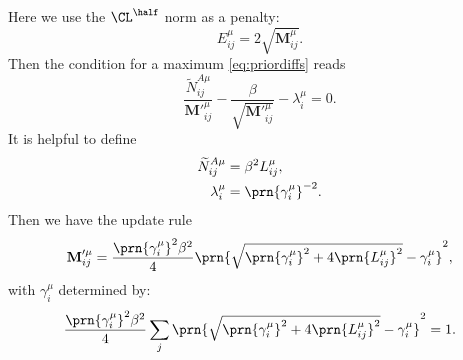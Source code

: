 \documentclass[12pt]{article}
\newcommand{\M}{\mathbf{M}}
\begin{document}
Here we use the  $\CL^\half$ norm as a penalty:
%
\begin{equation}\label{eq:Lhalfpenalty}
  E^\mu_{ij} = 2\sqrt{\M^\mu_{ij}}.
\end{equation}
%
Then the condition for a maximum \eqref{eq:priordiffs} reads
%
\begin{equation}\label{eq:Lhalfpriormax}
  \frac{ \widetilde{N}^{A\mu}_{ij} }{ \M'^\mu_{ij} }  - \frac{\beta}{\sqrt{\M'^\mu_{ij}}} - \lambda^\mu_{i} = 0.
\end{equation}
%
It is helpful to define
%
\begin{equation}\label{eq:Lhalfvars}
\begin{aligned}
  \widetilde{N}^{A\mu}_{ij} &= \beta^2 L^\mu_{ij}, \\
  \lambda^\mu_i &= \prn{\gamma^\mu_i}^{-2}.
\end{aligned}
\end{equation}
%
Then we have the update rule
%
\begin{equation}\label{eq:Lhalfupdate}
  \M'^\mu_{ij} = \frac{ \prn{\gamma^\mu_i}^2 \beta^2 }{ 4 } \prn{\sqrt{ \prn{\gamma^\mu_i}^2 + 4\prn{L^\mu_{ij}}^2 } - \gamma^\mu_i }^2, 
\end{equation}
%
with $\gamma^\mu_i$ determined by:
%
\begin{equation}\label{eq:Lhalfnorm}
    \frac{ \prn{\gamma^\mu_i}^2 \beta^2 }{ 4 } \sum_j \prn{\sqrt{\prn{\gamma^\mu_i}^2 + 4\prn{L^\mu_{ij}}^2} - \gamma^\mu_i}^2 = 1.
\end{equation}
%















\end{document}
